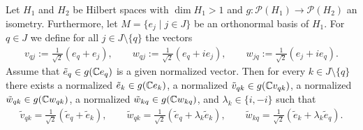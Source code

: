 \begin{lemma} \label{lemma:function_on_onb}
	Let $H_1$ and $H_2$ be Hilbert spaces with $\dim H_1 > 1$ and $g: \mathcal{P}(H_1) \to \mathcal{P}(H_2)$ an isometry. Furthermore, let $M = \{e_j \mid j \in J\}$ be an orthonormal basis of $H_1$. For $q \in J$ we define for all $j \in J \setminus \{q\}$ the vectors
	\begin{align*}
		v_{qj} := \frac{1}{\sqrt{2}} (e_q + e_j), \qquad w_{qj} := \frac{1}{\sqrt{2}}(e_q + ie_j), \qquad w_{jq} := \frac{1}{\sqrt{2}}(e_j + ie_q).
	\end{align*} 
	Assume that $\tilde{e}_q \in g{\left ( \mathbb{C} e_q \right )}$ is a given normalized vector. Then for every $k \in J \setminus \{q\}$ there exists a normalized $\tilde{e}_k \in g(\mathbb{C} e_k)$, a normalized $\tilde{v}_{qk} \in g(\mathbb{C} v_{qk})$, a normalized $\tilde{w}_{qk} \in g(\mathbb{C} w_{qk})$, a normalized $\tilde{w}_{kq} \in g(\mathbb{C} w_{kq})$, and $\lambda_k \in \{i, -i\}$ such that
	\begin{align*}
		\tilde{v}_{qk} = \frac{1}{\sqrt{2}}(\tilde{e}_{q} + \tilde{e}_k), \qquad \tilde{w}_{qk} = \frac{1}{\sqrt{2}}(\tilde{e}_q + \lambda_k \tilde{e}_k), \qquad \tilde{w}_{kq} = \frac{1}{\sqrt{2}} (\tilde{e}_k + \lambda_k \tilde{e}_q).
	\end{align*}
\end{lemma}

